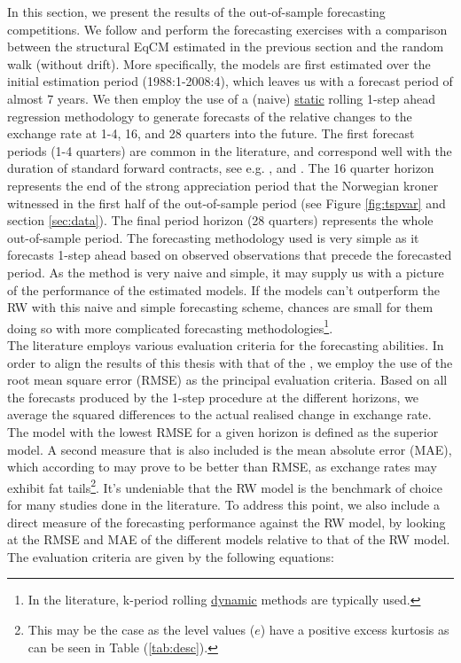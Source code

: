\documentclass[10pt]{article}
\numberwithin{equation}{section}
\numberwithin{table}{section}
\numberwithin{figure}{section}
\begin{document}
\begin{spacing}{1.5}
\noindent In this section, we present the results of the out-of-sample forecasting competitions. We follow \cite{meese1983out,meese1983empirical} and perform the forecasting exercises with a comparison between the structural EqCM estimated in the previous section and the random walk (without drift). More specifically, the models are first estimated over the initial estimation period (1988:1-2008:4), which leaves us with a forecast period of almost 7 years. We then employ the use of a (naive) \underline{static} rolling 1-step ahead regression methodology to generate forecasts of the relative changes to the exchange rate at 1-4, 16, and 28 quarters into the future. The first forecast periods (1-4  quarters) are common in the literature, and correspond well with the duration of standard forward contracts, see e.g. \cite{meese1983out,meese1983empirical}, \cite{reinton1999out} and \cite{bjornland2006importance}. The 16 quarter horizon represents the end of the strong appreciation period that the Norwegian kroner witnessed in the first half of the out-of-sample period (see Figure \ref{fig:tspvar} and section \ref{sec:data}). The final period horizon (28 quarters) represents the whole out-of-sample period. The forecasting methodology used is very simple as it forecasts 1-step ahead based on observed observations that precede the forecasted period. As the method is very naive and simple, it may supply us with a picture of the performance of the estimated models. If the models can't outperform the RW with this naive and simple forecasting scheme, chances are small for them doing so with more complicated forecasting methodologies\footnote{In the literature, k-period rolling \underline{dynamic} methods are typically used.}.\\
\indent The literature employs various evaluation criteria for the forecasting abilities. In order to align the results of this thesis with that of the \cite{meese1983out,meese1983empirical}, we employ the use of the root mean square error (RMSE) as the principal evaluation criteria. Based on all the forecasts produced by the 1-step procedure at the different horizons, we average the squared differences to the actual realised change in exchange rate. The model with the lowest RMSE for a given horizon is defined as the superior model. A second measure that is also included is the mean absolute error (MAE), which according to \citep{meese1983out,meese1983empirical} may prove to be better than RMSE, as exchange rates may exhibit fat tails\footnote{This may be the case as the level values ($e$) have a positive excess kurtosis as can be seen in Table (\ref{tab:desc}).}. It's undeniable that the RW model is the benchmark of choice for many studies done in the literature. To address this point, we also include a direct measure of the forecasting performance against the RW model, by looking at the RMSE and MAE of the different models relative to that of the RW model. The evaluation criteria are given by the following equations:

\end{spacing}
\end{document}
